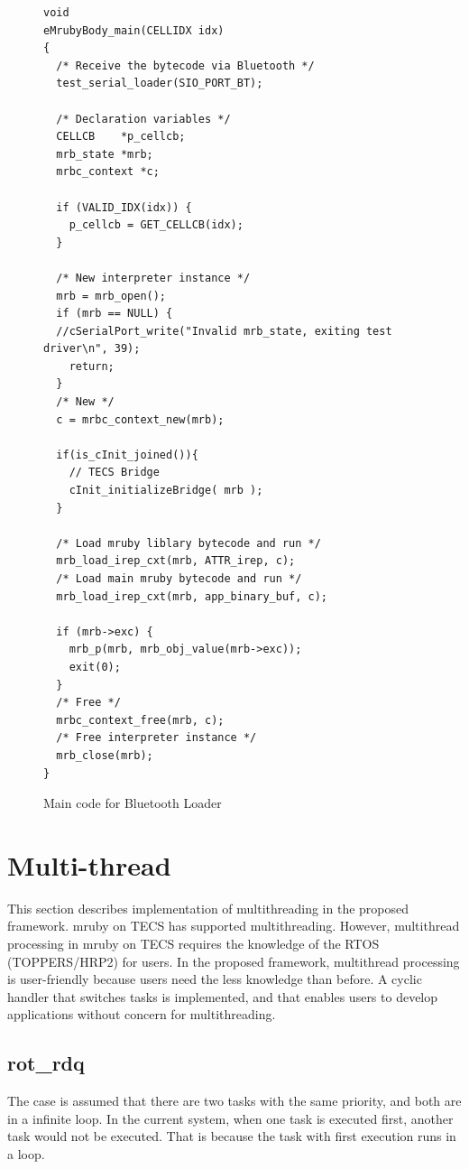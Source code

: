 \documentclass[conference,compsoc]{IEEEtran}
\begin{document}
\begin{figure}[t]
\centering
\begin{lstlisting}
void
eMrubyBody_main(CELLIDX idx)
{
  /* Receive the bytecode via Bluetooth */
  test_serial_loader(SIO_PORT_BT);

  /* Declaration variables */
  CELLCB	*p_cellcb;
  mrb_state *mrb;
  mrbc_context *c;
      
  if (VALID_IDX(idx)) {
    p_cellcb = GET_CELLCB(idx);
  }

  /* New interpreter instance */
  mrb = mrb_open();
  if (mrb == NULL) {
  //cSerialPort_write("Invalid mrb_state, exiting test driver\n", 39);
    return;
  }
  /* New */
  c = mrbc_context_new(mrb);

  if(is_cInit_joined()){
    // TECS Bridge
    cInit_initializeBridge( mrb );
  }
  
  /* Load mruby liblary bytecode and run */
  mrb_load_irep_cxt(mrb, ATTR_irep, c);
  /* Load main mruby bytecode and run */
  mrb_load_irep_cxt(mrb, app_binary_buf, c);
  
  if (mrb->exc) {
    mrb_p(mrb, mrb_obj_value(mrb->exc));
    exit(0);
  }
  /* Free */ 
  mrbc_context_free(mrb, c);
  /* Free interpreter instance */
  mrb_close(mrb);
}

\end{lstlisting}
\caption{Main code for Bluetooth Loader}
\label{maincode_mrubybluetooth}
\end{figure}
\section{Multi-thread}
\label{sec:Multithread}
This section describes implementation of multithreading in the proposed framework.
mruby on TECS has supported multithreading.
However, multithread processing in mruby on TECS requires the knowledge of the RTOS (TOPPERS/HRP2) for users.
In the proposed framework, multithread processing is user-friendly because users need the less knowledge than before.
A cyclic handler that switches tasks is implemented, and that enables users to develop applications without concern for multithreading.

 \subsection{rot\_rdq}
The case is assumed that there are two tasks with the same priority, and both are in a infinite loop.
In the current system, when one task is executed first, another task would not be executed.
That is because the task with first execution runs in a loop. 
\end{document}
